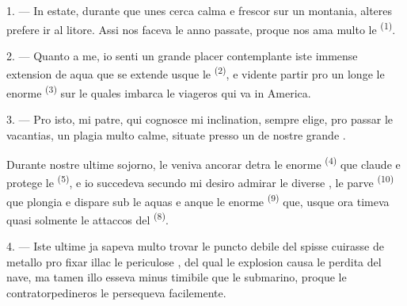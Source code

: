 %

\VUsaut{4.0mm}
\VUsaut{3.0mm}
\VUsaut{3.0mm}

1. --- In estate, durante que unes cerca calma e frescor sur un montania, alteres
prefere ir al litore. Assi nos faceva le anno passate, proque nos ama multo le
 \textsuperscript{(1)}.

2. --- Quanto a me, io senti un grande placer contemplante iste immense extension
de aqua que se extende usque le  \textsuperscript{(2)}, e
vidente partir pro un longe  le enorme  \textsuperscript{(3)} sur le quales imbarca le viageros qui va in
America.

3. --- Pro isto, mi patre, qui cognosce mi inclination, sempre elige, pro passar
le vacantias, un plagia multo calme, situate presso un de nostre grande
.

Durante nostre ultime sojorno, le  veniva ancorar detra le
enorme  \textsuperscript{(4)} que claude e protege le  \textsuperscript{(5)}, e io succedeva secundo mi desiro admirar le
diverse , le parve 
\textsuperscript{(10)} que plongia e dispare sub le aquas e anque le enorme
 \textsuperscript{(9)} que, usque ora timeva quasi solmente
le attaccos del  \textsuperscript{(8)}.

\VUsaut{3.0mm}
\VUsaut{3.0mm}

4. --- Iste ultime ja sapeva multo  trovar le puncto debile
del spisse cuirasse de metallo pro fixar illac le periculose
, del qual le explosion causa le perdita del nave, ma tamen
illo esseva minus timibile que le submarino, proque le contratorpedineros le
persequeva facilemente.

